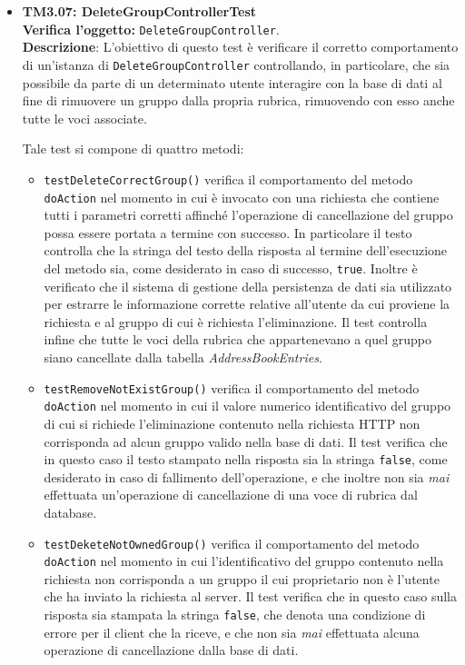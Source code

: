 \begin{itemize}
\item \textbf{TM3.07: DeleteGroupControllerTest}\\
\textbf{Verifica l'oggetto:} \texttt{DeleteGroupController}.\\
\textbf{Descrizione}: L'obiettivo di questo test è verificare il corretto comportamento di un'istanza di \texttt{DeleteGroupController} controllando, in particolare, che sia possibile da parte di un determinato utente interagire con la base di dati al fine di rimuovere un gruppo dalla propria rubrica, rimuovendo con esso anche tutte le voci associate.

Tale test si compone di quattro metodi:

\begin{itemize}

\item \texttt{testDeleteCorrectGroup()} verifica il comportamento del metodo \texttt{doAction} nel momento in cui è invocato con una richiesta che contiene tutti i parametri corretti affinché l'operazione di cancellazione del gruppo possa essere portata a termine con successo. In particolare il testo controlla che la stringa del testo della risposta al termine dell'esecuzione del metodo sia, come desiderato in caso di successo, \texttt{true}. Inoltre è verificato che il sistema di gestione della persistenza de dati sia utilizzato per estrarre le informazione corrette relative all'utente da cui proviene la richiesta e al gruppo di cui è richiesta l'eliminazione. Il test controlla infine che tutte le voci della rubrica che appartenevano a quel gruppo siano cancellate dalla tabella \textit{AddressBookEntries}. 

\item \texttt{testRemoveNotExistGroup()} verifica il comportamento del metodo \texttt{doAction} nel momento in cui il valore numerico identificativo del gruppo di cui si richiede l'eliminazione contenuto nella richiesta HTTP non corrisponda ad alcun gruppo valido nella base di dati. Il test verifica che in questo caso il testo stampato nella risposta sia la stringa \texttt{false}, come desiderato in caso di fallimento dell'operazione, e che inoltre non sia \textit{mai} effettuata un'operazione di cancellazione di una voce di rubrica dal database.

\item \texttt{testDeketeNotOwnedGroup()} verifica il comportamento del metodo \texttt{doAction} nel momento in cui l'identificativo del gruppo contenuto nella richiesta non corrisponda a un gruppo il cui proprietario non è l'utente che ha inviato la richiesta al server. Il test verifica che in questo caso sulla risposta sia stampata la stringa \texttt{false}, che denota una condizione di errore per il client che la riceve, e che non sia \textit{mai} effettuata alcuna operazione di cancellazione dalla base di dati.


\end{itemize}
\end{itemize}
